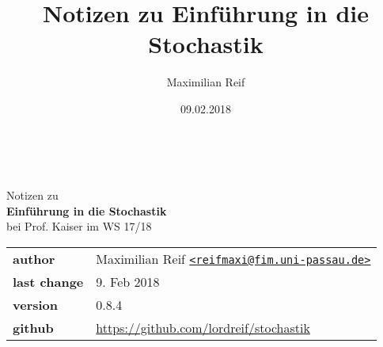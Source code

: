 \documentclass[11pt,a4paper,ngerman]{article}
\date{09.02.2018}
\author{Maximilian Reif}
\title{Notizen zu Einführung in die Stochastik}
\newcommand{\1}{\mathbbm{1}}
\begin{document}
\begin{titlepage}
    \ \newline\newline\newline\newline\newline

	\begin{center}

		\huge Notizen zu\\
		\Huge\textbf{Einführung in die Stochastik}\\
		\huge bei Prof. Kaiser im WS 17/18\\
		\normalsize

		\vspace{1cm}
		\begin{tabular}[b]{l|l}
			\textbf{author} 		& Maximilian Reif
			\texttt{\href{mailto:reifmaxi@fim.uni-passau.de}
			{<reifmaxi@fim.uni-passau.de>}}\\
			\textbf{last change}	& 9. Feb 2018 \\
			\textbf{version} 	& 0.8.4\\
			\textbf{github} 		& \url{https://github.com/lordreif/stochastik}
		\end{tabular}
		\vspace{1cm}

	\end{center}

	\begin{figure}[b]
	\centering
	\end{figure}

\end{titlepage}



\newpage
\tableofcontents\thispagestyle{empty}
\newpage

\setcounter{page}{1}





%

\end{document}
